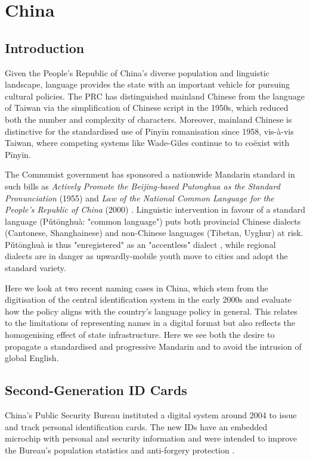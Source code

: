 \section{China}

\subsection{Introduction}

Given the People's Republic of China's diverse population and linguistic
landscape, language provides the state with an important vehicle for pursuing
cultural policies. The PRC has distinguished mainland Chinese from the language
of Taiwan via the simplification of Chinese script in the 1950s, which reduced
both the number and complexity of characters. Moreover, mainland Chinese is
distinctive for the standardised use of Pīnyīn romanisation since 1958,
vis-à-vis Taiwan, where competing systems like Wade-Giles continue to to
coëxist with Pīnyīn. 

The Communist government has sponsored a nationwide Mandarin standard in such
bills as \textit{Actively Promote the Beijing-based Putonghua as the Standard
Pronunciation} (1955) and \textit{Law of the National Common Language for the
People’s Republic of China} (2000) \parencite{dong10}. Linguistic intervention
in favour of a standard language (Pǔtōnghuà: "common language") puts both
provincial Chinese dialects (Cantonese, Shanghainese) and non-Chinese languages
(Tibetan, Uyghur) at risk. Pǔtōnghuà is thus "enregistered" as an "accentless"
dialect \parencite{dong10}, while regional dialects are in danger as
upwardly-mobile youth move to cities and adopt the standard variety.

Here we look at two recent naming cases in China, which stem from the
digitisation of the central identification system in the early 2000s and
evaluate how the policy aligns with the country's language policy in general.
This relates to the limitations of representing names in a digital format but
also reflects the homogenising effect of state infrastructure. Here we see both
the desire to propagate a standardised and progressive Mandarin and to avoid
the intrusion of global English.

\subsection{Second-Generation ID Cards}

China's Public Security Bureau instituted a digital system around 2004 to issue
and track personal identification cards. The new IDs have an embedded microchip
with personal and security information and were intended to improve the
Bureau's population statistics and anti-forgery protection \parencite{ciicn04}.

